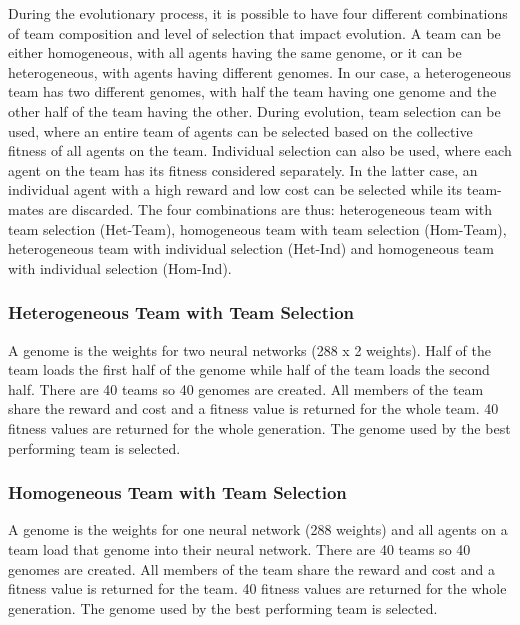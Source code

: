 \documentclass[12pt]{article}  %
\begin{document}
During the evolutionary process, it is possible to have four different combinations of team composition and level of selection that impact evolution.
A team can be either homogeneous, with all agents having the same genome, or it can be heterogeneous, with agents having different genomes.
In our case, a heterogeneous team has two different genomes, with half the team having one genome and the other half of the team having the other.
During evolution, team selection can be used, where an entire team of agents can be selected based on the collective fitness of all agents on the team.
Individual selection can also be used, where each agent on the team has its fitness considered separately.
In the latter case, an individual agent with a high reward and low cost can be selected while its team-mates are discarded. 
The four combinations are thus: heterogeneous team with team selection (Het-Team), homogeneous team with team selection (Hom-Team), heterogeneous team with individual selection (Het-Ind) and homogeneous team with individual selection (Hom-Ind).\\

\subsubsection{Heterogeneous Team with Team Selection}

A genome is the weights for two neural networks (288 x 2 weights).
Half of the team loads the first half of the genome while half of the team loads the second half. 
There are 40 teams so 40 genomes are created. 
All members of the team share the reward and cost and a fitness value is returned for the whole team. 
40 fitness values are returned for the whole generation. 
The genome used by the best performing team is selected.\\

\subsubsection{Homogeneous Team with Team Selection}

A genome is the weights for one neural network (288 weights) and all agents on a team load that genome into their neural network.
There are 40 teams so 40 genomes are created. 
All members of the team share the reward and cost and a fitness value is returned for the team.
40 fitness values are returned for the whole generation. 
The genome used by the best performing team is selected.\\
\end{document}
